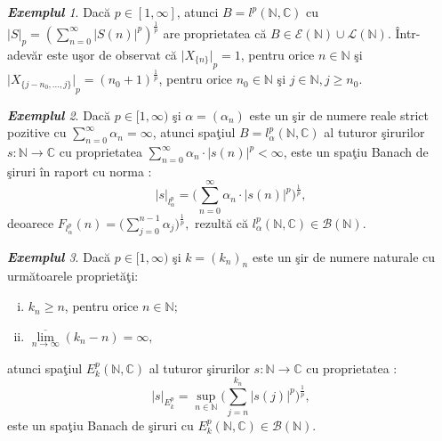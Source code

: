 \documentclass[ a4paper, 12pt]{report}
\theoremstyle{definition}
\theoremstyle{remark}
\newtheorem{exemple}{\bf Exemplul}[section]
\numberwithin{equation}{section}
\begin{document}
\begin{exemple}
Dac\u a $p \in [1,\infty]$, atunci $B=l^p(\mathbb{N},\mathbb{C})$ cu \\
${\lvert S \rvert}_p=(\sum\limits_{n=0}^{\infty}{{\lvert S(n) \rvert}^p})^\frac{1}{p}$ are proprietatea c\u a $B \in \mathcal{E}(\mathbb{N}) \cup \mathcal{L}(\mathbb{N})$. \^Intr-adev\u ar este u\c sor de observat c\u a ${\lvert X_{\{n\}} \rvert}_p=1$, pentru orice $n \in \mathbb{N}$ \c si ${\lvert X_{\{j-n_0,...,j\}} \rvert}_p={(n_0+1)}^\frac{1}{p}$, pentru orice $n_0 \in \mathbb{N}$ \c si $j \in \mathbb{N},j \geq n_0.$ 
\end{exemple}
\begin{exemple}
Dac\u a $p \in [1,\infty)$ \c si $\alpha = (\alpha_{n})$ este un \c sir de numere reale strict pozitive cu $\sum\limits_{n=0}^{\infty} \alpha_n = \infty$, atunci spa\c tiul $B = l_\alpha^p(\mathbb{N},\mathbb{C})$ al tuturor \c sirurilor $s : \mathbb{N} \rightarrow \mathbb{C}$ cu proprietatea  $\sum\limits_{n=0}^{\infty} \alpha_n \cdot \lvert s(n) \rvert^p < \infty$, este un spa\c tiu Banach de \c siruri \^in raport cu norma :
\[ \lvert s \rvert_{l_{\alpha}^{p}} = \Big(\sum\limits_{n=0}^{\infty} \alpha_n \cdot \lvert s(n) \rvert^p\Big)^{\frac{1}{p}},\]deoarece $F_{l_{\alpha}^{p}}(n) = \Big(\sum\limits_{j=0}^{n-1} \alpha_j\Big)^{\frac{1}{p}} ,$
rezult\u a c\u a $l_{\alpha}^{p}(\mathbb{N},\mathbb{C}) \in \mathcal{B}(\mathbb{N}).$
\end{exemple}
\begin{exemple}
Dac\u a $p\in [1,\infty)$ \c si $k = (k_n)_n$ este un \c sir de numere naturale cu urm\u atoarele propriet\u a\c ti:
\begin{enumerate}[(i)]
\item $k_n \geq n$, pentru orice $n \in \mathbb{N};$
\item $\overline{\lim\limits_{n \rightarrow \infty}}(k_n - n) = \infty,$
\end{enumerate} atunci spa\c tiul $E_{k}^{p}(\mathbb{N},\mathbb{C})$ al tuturor \c sirurilor $s : \mathbb{N} \rightarrow \mathbb{C}$ cu proprietatea :
\[ \lvert s \rvert_{E_{k}^{p}} = \sup\limits_{n \in \mathbb{N}}\Big(\sum\limits_{j=n}^{k_n}\lvert s(j) \rvert^{p}\Big)^{\frac{1}{p}},\] este un spa\c tiu Banach de \c siruri cu $E_{k}^{p}(\mathbb{N},\mathbb{C}) \in \mathcal{B}(\mathbb{N}).$
\end{exemple}
\end{document}
